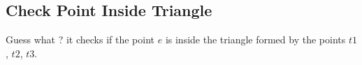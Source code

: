 \subsection{Check Point Inside Triangle}

Guess what ? it checks if the point $e$ is inside the triangle formed
by the points $t1$, $t2$, $t3$.


